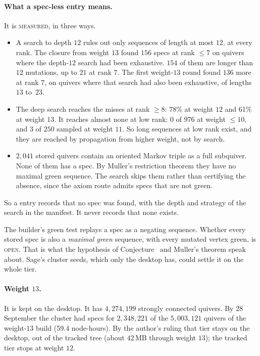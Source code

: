 \documentclass[11pt]{amsart}
\makeatletter
\theoremstyle{remark}
\newcommand{\pref}[1]{\@ifundefined{r@P-#1}{\textup{[\texttt{\detokenize{#1}}]}}{\ref{P-#1}}}
\newcommand{\MEASURED}{\textsc{measured}}
\newcommand{\OPEN}{\textsc{open}}
\makeatother
\begin{document}
\paragraph{What a spec-less entry means.}  It is \MEASURED{}, in three ways.
\begin{itemize}[leftmargin=*]
  \item A search to depth $12$ rules out only sequences of length at most
    $12$, at every rank.  The closure from weight $13$ found $156$ specs at
    rank $\le 7$ on quivers where the depth-$12$ search had been
    exhaustive.  $154$ of them are longer than $12$ mutations, up to $21$ at
    rank $7$.  The first weight-$13$ round found $136$ more at rank $7$, on
    quivers where that search had also been exhaustive, of lengths $13$
    to~$23$.
  \item The deep search reaches the misses at rank $\ge 8$: 78\% at weight
    $12$ and 61\% at weight $13$.  It reaches almost none at low rank: $0$ of
    $976$ at weight $\le 10$, and $3$ of $250$ sampled at weight $11$.  So
    long sequences at low rank exist, and they are reached by propagation
    from higher weight, not by search.
  \item $2{,}041$ stored quivers contain an oriented Markov triple as a full
    subquiver.  None of them has a spec.  By Muller's restriction theorem they
    have no maximal green sequence.  The search skips them rather than
    certifying the absence, since the axiom route admits specs that are not
    green.
\end{itemize}
So a  entry records that no spec was found, with
the depth and strategy of the search in the manifest.  It never records that
none exists.

The builder's green test replays a spec as a negating sequence.  Whether
every stored spec is also a \emph{maximal green} sequence, with every mutated
vertex green, is \OPEN{}.  That is what the hypothesis of
Conjecture~\pref{conj:cluster} and Muller's theorem speak about.  Sage's
cluster seeds, which only the desktop has, could settle it on the whole
tier.

\paragraph{Weight $13$.}  It is kept on the desktop.  It has $4{,}274{,}199$
strongly connected quivers.  By 28 September the cluster had specs for
$2{,}348{,}221$ of the $5{,}003{,}121$ quivers of the weight-$13$ build
(59.4 node-hours).  By the author's ruling that tier stays on the desktop,
out of the tracked tree (about $42$\,MB through weight $13$); the tracked
tier stops at weight $12$.
\end{document}
